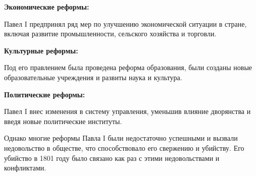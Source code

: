 \textbf{Экономические реформы:}

Павел I предпринял ряд мер по улучшению экономической ситуации в стране, включая развитие промышленности, сельского хозяйства и торговли.

\textbf{Культурные реформы:}

Под его правлением была проведена реформа образования, были созданы новые образовательные учреждения и развиты наука и культура.

\textbf{Политические реформы:}

Павел I внес изменения в систему управления, уменьшив влияние дворянства и введя новые политические институты.

Однако многие реформы Павла I были недостаточно успешными и вызвали недовольство в обществе, что способствовало его свержению и убийству. Его убийство в 1801 году было связано как раз с этими недовольствами и конфликтами.
